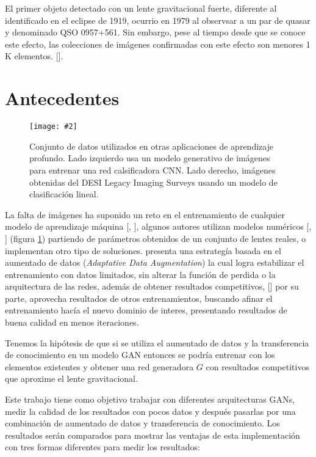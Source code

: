\documentclass[letterpaper,12pt,oneside]{book}
\newcommand{\figura}[4]{
          \begin{figure}[H]
            \centering
            \texttt{[image: \#2]}
            \caption{#3}
            \label{#4}
          \end{figure}
                            }
\begin{document}
                El primer objeto detectado con un lente gravitacional fuerte, diferente al identificado en el eclipse de 1919, ocurrio en 1979 al observsar a un par de quasar y denominado QSO 0957+561. Sin embargo, pese al tiempo desde que se conoce este efecto, las colecciones de imágenes confirmadas con este efecto son menores 1 K elementos. [\cite{khachatryan2021machine}].
            
    
            \section{Antecedentes}
                    \figura{0.25}{Imagenes/Resultados/antecedentes.png}{Conjunto de datos utilizados en otras aplicaciones de aprendizaje profundo. Lado izquierdo usa un modelo generativo de imágenes para entrenar una red calsificadora CNN. Lado derecho, imágenes obtenidas del DESI Legacy Imaging Surveys usando un modelo de clasificación lineal.}{fig:antecedentes}

                La falta de imágenes ha suponido un reto en el entrenamiento de cualquier modelo de aprendizaje máquina [\cite{wilde2022detecting}, \cite{tran2022agel}], algunos autores utilizan modelos numéricos [\cite{vago2022deepgravilens}, \cite{madireddy2019modular}] (figura \ref{fig:antecedentes}) partiendo de parámetros obtenidos de un conjunto de lentes reales, o implementan otro tipo de soluciones. \cite{karras2020training} presenta una estrategía basada en el aumentado de datos ({\it Adaptative Data Augmentation}) la  cual logra estabilizar el entrenamiento con datos limitados, sin alterar la función de perdida o la arquitectura de las redes, además de obtener resultados competitivos, [\cite{wang2018transferring}] por su parte, aprovecha resultados de otros entrenamientos, buscando afinar el entrenamiento hacía el nuevo dominio de interes, presentando resultados de buena calidad en menos iteraciones. 


            Tenemos la hipótesis de que si se utiliza el aumentado de datos y la transferencia de conocimiento en un modelo GAN entonces se podría entrenar con los elementos existentes y obtener una red generadora $G$ con resultados competitivos que aproxime el lente gravitacional. 

            Este trabajo tiene como objetivo trabajar con diferentes arquitecturas GANs, medir la calidad de los resultados con pocos datos y después pasarlas por una combinación de aumentado de datos y transferencia de conocimiento. Los resultados serán comparados para mostrar las ventajas de esta implementación con tres formas diferentes para medir los resultados:
\end{document}
